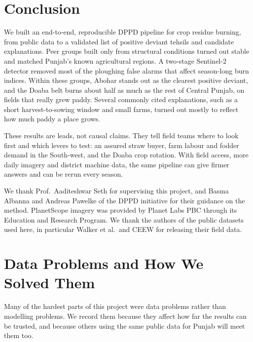 \documentclass[sigconf,nonacm]{acmart}
\begin{document}
\section{Conclusion}

We built an end-to-end, reproducible DPPD pipeline for crop residue burning, from public data to a validated list of positive deviant tehsils and candidate explanations. Peer groups built only from structural conditions turned out stable and matched Punjab's known agricultural regions. A two-stage Sentinel-2 detector removed most of the ploughing false alarms that affect season-long burn indices. Within these groups, Abohar stands out as the clearest positive deviant, and the Doaba belt burns about half as much as the rest of Central Punjab, on fields that really grew paddy. Several commonly cited explanations, such as a short harvest-to-sowing window and small farms, turned out mostly to reflect how much paddy a place grows.

These results are leads, not causal claims. They tell field teams where to look first and which levers to test: an assured straw buyer, farm labour and fodder demand in the South-west, and the Doaba crop rotation. With field access, more daily imagery and district machine data, the same pipeline can give firmer answers and can be rerun every season.

\begin{acks}
We thank Prof.\ Aaditeshwar Seth for supervising this project, and Basma Albanna and Andreas Pawelke of the DPPD initiative for their guidance on the method. PlanetScope imagery was provided by Planet Labs PBC through its Education and Research Program. We thank the authors of the public datasets used here, in particular Walker et al.\ and CEEW for releasing their field data.
\end{acks}




\appendix

\section{Data Problems and How We Solved Them}
\label{app:problems}

Many of the hardest parts of this project were data problems rather than modelling problems. We record them because they affect how far the results can be trusted, and because others using the same public data for Punjab will meet them too.
\end{document}
